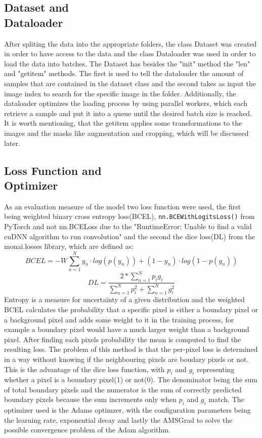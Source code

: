 \documentclass{article}
\begin{document}
\begin{multicols}{2}
\subsection{Dataset and \\Dataloader}
After spliting the data into the appropriate folders, the class Dataset was created in order to have access to the data and the class Dataloader was used 
in order to load the data into batches. The Dataset has besides the "init" method the "len" and "getitem" methods. The first is used to tell the dataloader the 
amount of samples that are contained in the dataset class and the second takes as input the image index to search for the specific image in the folder. Additionally, the dataloader 
optimizes the loading process by using parallel workers, which each retrieve a sample and put it into a queue until the desired batch size is reached. It is worth mentioning,
that the getitem applies some transformations to the images and the masks like augmentation and cropping, which will be discussed later.

\subsection{Loss Function and\\ Optimizer}
As an evaluation measure of the model two loss function were used, the first being weighted binary cross entropy loss(BCEL), \texttt{nn.BCEWithLogitsLoss()} from PyTorch
and not nn.BCELoss due to the "RuntimeError: Unable to find a valid cuDNN algorithm to run convolution" and the second the dice loss(DL) from the monai.losses library, which are defined as:
\begin{dmath}
BCEL= -W\sum_{n=1}^{N}y_n\cdot log(p(y_n)) +(1-y_n)\cdot log(1-p(y_n))
\end{dmath}
\begin{dmath}
DL = \frac{2*\sum_{n=1}^{N}p_ig_i}{\sum_{n=1}^{N}p_i^2 + \sum_{n=1}^{N}g_i^2}
\end{dmath}
Entropy is a measure for uncertainty of a given distribution and the weighted BCEL calculates the probability that a specific pixel is either a boundary pixel or a background pixel and
adds some weight to it in the training process, for example a boundary pixel would have a much larger weight than a background pixel. After finding each pixels probability the mean is computed to find the resulting loss. 
The problem of this method is that the per-pixel loss is determined in a way without knowing if the neighbouring pixels are boudary pixels or not. 
This is the advantage of the dice loss function, with $p_i$ and $g_i$ representing whether a pixel is a boundary pixel(1) or not(0). The denominator 
being the sum of total boundary pixels and the numerator is the sum of correctly predicted boundary pixels because the sum increments only when $p_i$ and $g_i$ match.
The optimizer used is the Adams optimzer, with the configuration parameters being the learning rate, exponential decay and lastly the AMSGrad to solve the possible
convergence problem of the Adam algorithm.


\end{multicols}
\end{document}
